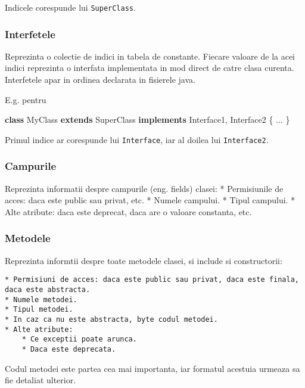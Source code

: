 \documentclass[]{article}
\newenvironment{Shaded}{}{}
\newcommand{\KeywordTok}[1]{\textcolor[rgb]{0.00,0.44,0.13}{\textbf{#1}}}
\newcommand{\NormalTok}[1]{#1}
\begin{document}
Indicele corespunde lui \texttt{SuperClass}.

\subsubsection{Interfetele}\label{interfetele}

Reprezinta o colectie de indici in tabela de constante. Fiecare valoare
de la acei indici reprezinta o interfata implementata in mod direct de
catre clasa curenta. Interfetele apar in ordinea declarata in fisierele
java.

E.g. pentru

\begin{Shaded}
\begin{Highlighting}[]
\KeywordTok{class}\NormalTok{ MyClass }\KeywordTok{extends}\NormalTok{ SuperClass }\KeywordTok{implements}\NormalTok{ Interface1, Interface2 \{}
\NormalTok{    ...}
\NormalTok{\}}
\end{Highlighting}
\end{Shaded}

Primul indice ar corespunde lui \texttt{Interface}, iar al doilea lui
\texttt{Interface2}.

\subsubsection{Campurile}\label{campurile}

Reprezinta informatii despre campurile (eng. fields) clasei: *
Permisiunile de acces: daca este public sau privat, etc. * Numele
campului. * Tipul campului. * Alte atribute: daca este deprecat, daca
are o valoare constanta, etc.

\subsubsection{Metodele}\label{metodele}

Reprezinta informtii despre toate metodele clasei, si include si
constructorii:

\begin{verbatim}
* Permisiuni de acces: daca este public sau privat, daca este finala, daca este abstracta.
* Numele metodei.
* Tipul metodei.
* In caz ca nu este abstracta, byte codul metodei.
* Alte atribute:
    * Ce exceptii poate arunca.
    * Daca este deprecata.
\end{verbatim}

Codul metodei este partea cea mai importanta, iar formatul acestuia
urmeaza sa fie detaliat ulterior.
\end{document}
